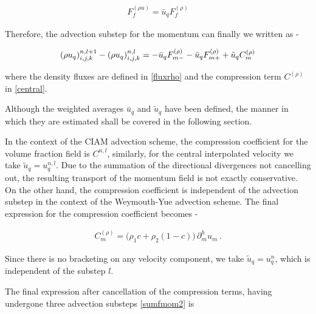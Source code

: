 \begin{align}
 F^{(\rho u)}_{f} = \bar u_q F^{(\rho)}_{f} \label{frou}
\end{align}


Therefore, the advection substep for the momentum can finally we written as -   


\begin{align}
{(\rho u_{q})_{i,j,k}^{n,l+1} - (\rho u_{q})_{i,j,k}^{n,l}} =  -\bar u_q  F^{(\rho)}_{m-} - \bar u_q  F^{(\rho)}_{m+} 
+ \tilde u_q C_m^{(\rho)}
\label{sumfmom2}
\end{align}


where the density fluxes are defined in \eqref{fluxrho} and the compression term 
$C^{(\rho)}$ in \eqref{central}. 



Although the weighted averages $\bar u_q$ and $\tilde u_q$ have been defined,
the manner in which they are estimated shall be covered in the following section. 

In the context of the CIAM advection scheme, the compression coefficient
for the volume fraction field is $C^{n,l}$, similarly, for the 
central interpolated velocity we take $\tilde u_q = u_q^{n,l}$. 
Due to the summation of the directional divergences not cancelling out,
the resulting transport of the momentum field is not exactly conservative.
On the other hand, the compression coefficient is independent 
of the advection substep in the context of the Weymouth-Yue advection scheme. 
The final expression for the compression coefficient becomes - 


\begin{align}
C_m^{(\rho)} =  \Big( \rho_1 c + \rho_2 (1-c ) \Big) \,\partial_{m}^h u_m  \,.
\label{central2}
\end{align}


Since there is no bracketing on any velocity component, 
we take $\tilde u_q = u_q^{n}$, which is independent of the substep $l$.



The final expression after cancellation of the compression terms,
having undergone three advection substeps \eqref{sumfmom2} is  

